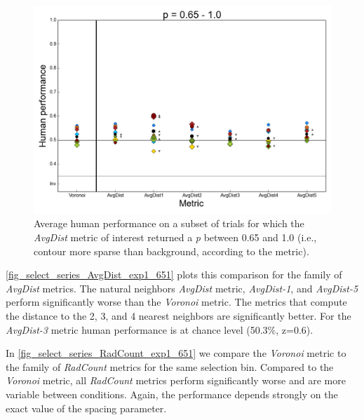 \documentclass[12pt]{article}
\begin{document}
\begin{figure}
\includegraphics{Figures/FIG_SUP_select_series_AvgDist_exp1_651.png}
\caption{Average human performance on a subset of trials for which the \emph{AvgDist} metric of interest returned a \emph{p} between 0.65 and 1.0 (i.e., contour more sparse than background, according to the metric).}
\label{fig_select_series_AvgDist_exp1_651}
\end{figure}

\autoref{fig_select_series_AvgDist_exp1_651} plots this comparison for the family of \textit{AvgDist} metrics. The natural neighbors \emph{AvgDist} metric, \emph{AvgDist-1}, and \emph{AvgDist-5} perform significantly worse than the \emph{Voronoi} metric. The metrics that compute the distance to the 2, 3, and 4 nearest neighbors are significantly better. For the \emph{AvgDist-3} metric human performance is at chance level (50.3\%, z=0.6).

In \autoref{fig_select_series_RadCount_exp1_651} we compare the \emph{Voronoi} metric to the family of \emph{RadCount} metrics for the same selection bin. Compared to the \emph{Voronoi} metric, all \emph{RadCount} metrics perform significantly worse and are more variable between conditions. Again, the performance depends strongly on the exact value of the spacing parameter.
\end{document}
